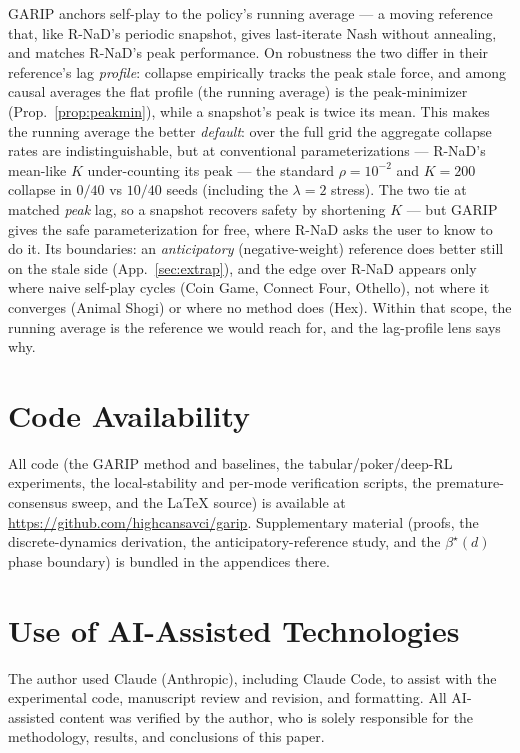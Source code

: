 \documentclass[10pt,twocolumn]{article}
\theoremstyle{plain}
\theoremstyle{remark}
\begin{document}
GARIP anchors self-play to the policy's running average --- a moving reference
that, like R-NaD's periodic snapshot, gives last-iterate Nash without annealing,
and matches R-NaD's peak performance. On robustness the two differ in their
reference's lag \emph{profile}: collapse empirically tracks the peak stale force,
and among causal averages the flat profile (the running average) is the
peak-minimizer (Prop.~\ref{prop:peakmin}), while a snapshot's peak is twice its mean.
This makes the running average the better \emph{default}: over the full grid the
aggregate collapse rates are indistinguishable, but at conventional parameterizations
--- R-NaD's mean-like $K$ under-counting its peak --- the standard $\rho\!=\!10^{-2}$
and $K\!=\!200$ collapse in $0/40$ vs $10/40$ seeds (including the $\lambda\!=\!2$
stress). The two tie at matched \emph{peak} lag, so a snapshot recovers safety by
shortening $K$ --- but GARIP gives the safe parameterization for free, where R-NaD
asks the user to know to do it. Its boundaries: an \emph{anticipatory}
(negative-weight) reference does better still on the stale side
(App.~\ref{sec:extrap}), and the edge over R-NaD appears only where naive self-play
cycles (Coin Game, Connect Four, Othello), not where it converges (Animal Shogi) or
where no method does (Hex). Within that scope, the running average is the reference
we would reach for, and the lag-profile lens says why.

\section*{Code Availability}
All code (the GARIP method and baselines, the tabular/poker/deep-RL experiments, the
local-stability and per-mode verification scripts, the premature-consensus sweep, and
the \LaTeX{} source) is available at \url{https://github.com/highcansavci/garip}.
Supplementary material (proofs, the discrete-dynamics derivation, the anticipatory-reference
study, and the $\beta^\star(d)$ phase boundary) is bundled in the appendices there.

\section*{Use of AI-Assisted Technologies}
The author used Claude (Anthropic), including Claude Code, to assist with the experimental
code, manuscript review and revision, and formatting. All AI-assisted content was verified
by the author, who is solely responsible for the methodology, results, and conclusions of
this paper.
\end{document}
